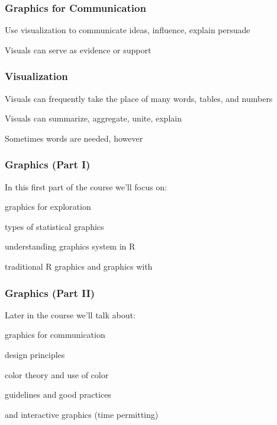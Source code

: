 \documentclass[12pt]{beamer}\usepackage[]{graphicx}\usepackage[]{color}
\begin{document}
\begin{frame}
\frametitle{Graphics for Communication}

Use visualization to communicate ideas, influence, explain persuade

\bigskip
Visuals can serve as evidence or support

\end{frame}


\begin{frame}
\frametitle{Visualization}

\bbi
  \item Visuals can frequently take the place of many words, tables, and numbers
  \item Visuals can summarize, aggregate, unite, explain
  \item Sometimes words are needed, however
\ei

\end{frame}


\begin{frame}
\frametitle{Graphics (Part I)}

In this first part of the course we'll focus on:
\bi
  \item graphics for exploration
  \item types of statistical graphics
  \item understanding graphics system in R
  \item traditional R graphics and graphics with 
\ei

\end{frame}


\begin{frame}
\frametitle{Graphics (Part II)}

Later in the course we'll talk about:
\bi
  \item graphics for communication
  \item design principles
  \item color theory and use of color
  \item guidelines and good practices
  \item {} and interactive graphics (time permitting)
\ei

\end{frame}
\end{document}
